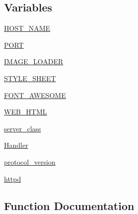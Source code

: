 \subsection*{Variables}
\begin{DoxyCompactItemize}
\item 
\hyperlink{namespaceprojects_1_1personality__captions_1_1interactive_a9ced4af3bcb3aa0d1bc814cef710e6d9}{H\+O\+S\+T\+\_\+\+N\+A\+ME}
\item 
\hyperlink{namespaceprojects_1_1personality__captions_1_1interactive_aea2e29df65dc732ad104f5a244fea7a3}{P\+O\+RT}
\item 
\hyperlink{namespaceprojects_1_1personality__captions_1_1interactive_a0cfa01e7e0553d70c9040b1ba3a5ab4c}{I\+M\+A\+G\+E\+\_\+\+L\+O\+A\+D\+ER}
\item 
\hyperlink{namespaceprojects_1_1personality__captions_1_1interactive_abfbad8eff0a52080f180b9d814910890}{S\+T\+Y\+L\+E\+\_\+\+S\+H\+E\+ET}
\item 
\hyperlink{namespaceprojects_1_1personality__captions_1_1interactive_a89a5a76ae43a3c1df28800762ac5140a}{F\+O\+N\+T\+\_\+\+A\+W\+E\+S\+O\+ME}
\item 
\hyperlink{namespaceprojects_1_1personality__captions_1_1interactive_a7c3681f36fedf5261f17a50a4cf58b2d}{W\+E\+B\+\_\+\+H\+T\+ML}
\item 
\hyperlink{namespaceprojects_1_1personality__captions_1_1interactive_addcc3c9fe5ea6cea1c27b25747212851}{server\+\_\+class}
\item 
\hyperlink{namespaceprojects_1_1personality__captions_1_1interactive_ae24fa5ef9665f775352eac9d6968713e}{Handler}
\item 
\hyperlink{namespaceprojects_1_1personality__captions_1_1interactive_aa1635234971b329d90a80ccbf388c3c3}{protocol\+\_\+version}
\item 
\hyperlink{namespaceprojects_1_1personality__captions_1_1interactive_ae631e34db5e50d6236da3b5b85427076}{httpd}
\end{DoxyCompactItemize}


\subsection{Function Documentation}
\mbox{\label{namespaceprojects_1_1personality__captions_1_1interactive_aa5144adf4092cfa1c2dc076d766226a1}} 
